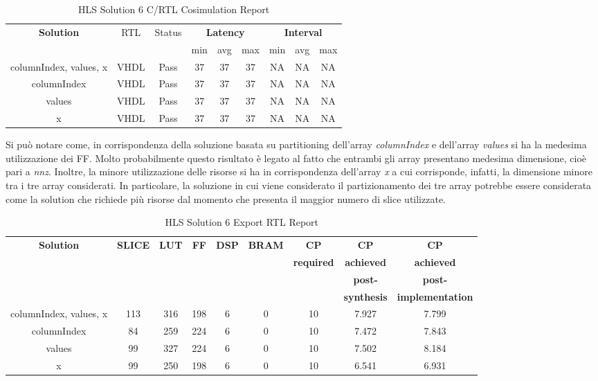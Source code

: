 \begin{table}[H]
	\centering
	\begin{tabular}{|c|c|c|c|c|c|c|c|c|}
		\hline
		\multicolumn{1}{|c|}{\textbf{Solution}} & \multicolumn{1}{|c|}{RTL} & \multicolumn{1}{|c|}{Status} & \multicolumn{3}{c|}{\textbf{Latency}} & \multicolumn{3}{c|}{\textbf{Interval}} \\
		& &  & min & avg & max & min & avg & max \\
		\hline
		columnIndex, values, x & VHDL & Pass & 37 & 37 & 37 & NA & NA & NA \\
		\hline
		columnIndex & VHDL & Pass & 37 & 37 & 37 & NA & NA & NA \\
		\hline
		values & VHDL & Pass & 37 & 37 & 37 & NA & NA & NA \\
		\hline
		x & VHDL & Pass & 37 & 37 & 37 & NA & NA & NA \\
		\hline
	\end{tabular}
	\caption{HLS Solution 6 C/RTL Cosimulation Report }
	\label{tab:hls-solution-6-cosimulation-report}
\end{table}

Si può notare come, in corrispondenza della soluzione basata su partitioning dell'array \textit{columnIndex} e dell'array \textit{values} si ha la medesima utilizzazione dei FF. Molto probabilmente questo risultato è legato al fatto che entrambi gli array presentano medesima dimensione, cioè pari a \textit{nnz}. Inoltre, la minore utilizzazione delle risorse si ha in corrispondenza dell'array \textit{x} a cui corrisponde, infatti, la dimensione minore tra i tre array considerati. In particolare, la soluzione in cui viene considerato il partizionamento dei tre array potrebbe essere considerata come la solution che richiede più risorse dal momento che presenta il maggior numero di slice utilizzate.

\begin{table}[H]
	\centering
	\begin{tabular}{|c|c|c|c|c|c|c|c|c|}
		\hline
		\textbf{Solution} & \textbf{SLICE} & \textbf{LUT} & \textbf{FF} & \textbf{DSP} & \textbf{BRAM} & \textbf{CP} & \textbf{CP} & \textbf{CP} \\
		& & & & & & \textbf{required} & \textbf{achieved} & \textbf{achieved}\\
		& & & & & & & \textbf{post-} & \textbf{post-}\\
		& & & & & & & \textbf{synthesis} & \textbf{implementation}\\
		\hline
		columnIndex, values, x  & 113 & 316 & 198 & 6 & 0 & 10 & 7.927 & 7.799 \\
		\hline
		columnIndex  & 84 & 259 & 224 & 6 & 0 & 10 & 7.472 & 7.843 \\
		\hline
		values  & 99 & 327 & 224 & 6 & 0 & 10 & 7.502 & 8.184 \\
		\hline
		x  & 99 & 250 & 198 & 6 & 0 & 10 & 6.541 & 6.931 \\
		\hline
	\end{tabular}
	\caption{HLS Solution 6 Export RTL Report}
	\label{tab:hls-solution-6-export-rtl-report}
\end{table}